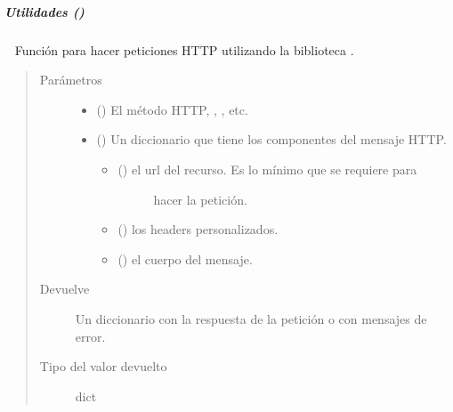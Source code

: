 \subparagraph{Utilidades ()}
\label{\detokenize{chapter_two/desc_cloudnao:utilidades-utils}}

\begin{fulllineitems}
\label{\detokenize{chapter_two/desc_cloudnao:app.utils.requests_utils.make_request}}~
Función para hacer peticiones HTTP utilizando la biblioteca .
\begin{quote}\begin{description}
\item[{Parámetros}] \leavevmode\begin{itemize}
\item {} 
 () \textendash{} El método HTTP, , , etc.

\item {} 
 () \textendash{} 
Un diccionario que tiene los componentes del mensaje HTTP.
\begin{itemize}
\item {} \begin{description}
\item[{ () el url del recurso. Es lo mínimo que se requiere para}] \leavevmode
hacer la petición.

\end{description}

\item {} 
 () los headers personalizados.

\item {} 
 () el cuerpo del mensaje.

\end{itemize}


\end{itemize}

\item[{Devuelve}] \leavevmode
Un diccionario con la respuesta de la petición o con mensajes de error.

\item[{Tipo del valor devuelto}] \leavevmode
dict

\end{description}\end{quote}

\end{fulllineitems}

